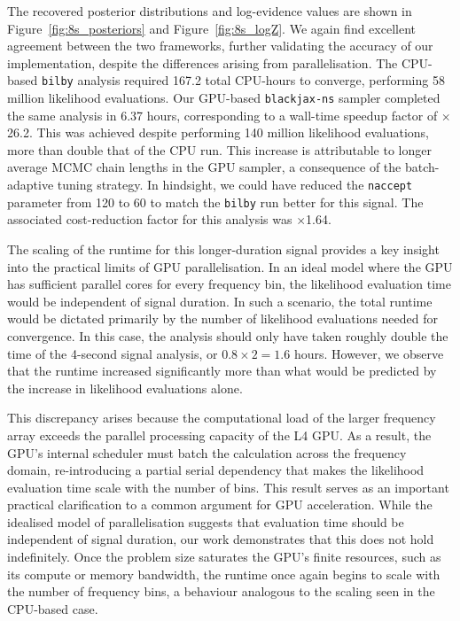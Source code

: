 \documentclass[fleqn,usenatbib]{mnras}
\begin{document}
The recovered posterior distributions and log-evidence values are shown
in Figure~\ref{fig:8s_posteriors} and Figure~\ref{fig:8s_logZ}. We again
find excellent agreement between the two frameworks, further validating
the accuracy of our implementation, despite the differences arising from 
parallelisation. The CPU-based \texttt{bilby} analysis required 167.2 total CPU-hours to
converge, performing 58 million likelihood evaluations. Our GPU-based
\texttt{blackjax-ns} sampler completed the same analysis in 6.37 hours,
corresponding to a wall-time speedup factor of $\times$26.2. This was
achieved despite performing 140 million likelihood evaluations, more than
double that of the CPU run. This increase is attributable to longer average
MCMC chain lengths in the GPU sampler, a consequence of the
batch-adaptive tuning strategy. In hindsight, we could have reduced the
\texttt{naccept} parameter from 120 to 60 to match the \texttt{bilby} run better for
this signal.
The associated cost-reduction factor for this
analysis was $\times$1.64.

The scaling of the runtime for this longer-duration signal provides a
key insight into the practical limits of GPU parallelisation. In an
ideal model where the GPU has sufficient parallel cores for every
frequency bin, the likelihood evaluation time would be independent of
signal duration. In such a scenario, the total runtime would be dictated
primarily by the number of likelihood evaluations needed for convergence.
In this case, the analysis should only have taken roughly double the time
of the 4-second signal analysis, or $0.8 \times 2 = 1.6$ hours. 
However, we observe that the runtime increased significantly more than
what would be predicted by the increase in likelihood evaluations alone.


This discrepancy arises because the computational load of the larger
frequency array exceeds the parallel processing capacity of the L4 GPU.
As a result, the GPU's internal scheduler must batch the calculation
across the frequency domain, re-introducing a partial serial dependency
that makes the likelihood evaluation time scale with the number of bins.
This result serves as an important practical clarification to a common
argument for GPU acceleration. While the idealised model of
parallelisation suggests that evaluation time should be independent of
signal duration, our work demonstrates that this does not hold
indefinitely. Once the problem size saturates the GPU's finite
resources, such as its compute or memory bandwidth, the runtime once
again begins to scale with the number of frequency bins, a behaviour
analogous to the scaling seen in the CPU-based case.
\end{document}
